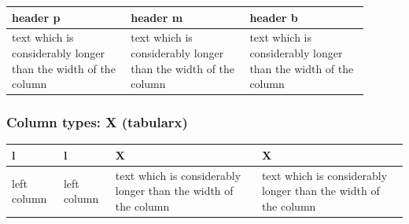 \begin{filecontents*}{\democodefile}
\begin{center}
\small\renewcommand{\arraystretch}{1.4}
\begin{tabular}{|p{0.3\linewidth}|m{0.3\linewidth}|b{0.3\linewidth}|}
\hline
\centering header p &
\centering header m &   
\centering header b \tabularnewline
\hline
text which is considerably longer than the width of the column  & 
text which is considerably longer than the width of the column  & 
text which is considerably longer than the width of the column 
\\
\hline
\end{tabular}
\end{center}
\end{filecontents*}

%

\subsubsection{Column types: X (tabularx)}

\begin{filecontents*}{\democodefile}
\begin{center}
\small\renewcommand{\arraystretch}{1.4}
\small
\begin{tabularx}{0.9\textwidth}{llXX}
\hline
l & l & X & X \\\hline
%
left column & left column & 
text which is considerably longer than the width of the column & 
text which is considerably longer than the width of the column \\
\hline
\end{tabularx}
\end{center}
\end{filecontents*}

